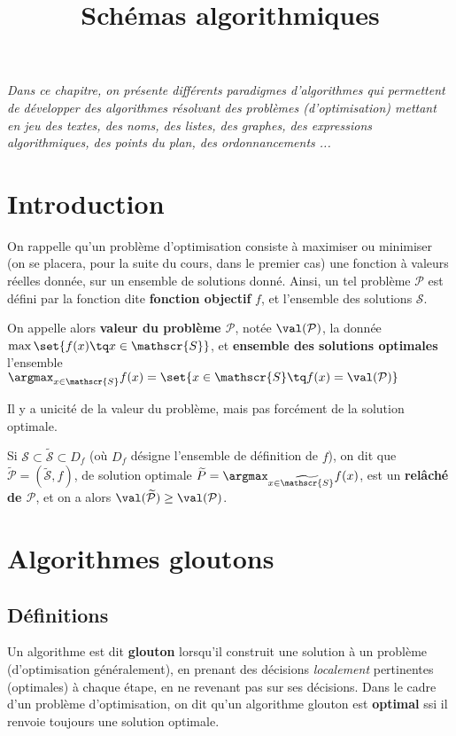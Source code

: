 \documentclass{scrartcl}
\title{Schémas algorithmiques}
\author{}
\date{}
\begin{document}
	\maketitle
	\begin{center}
		\textsl{Dans ce chapitre, on présente différents paradigmes d'algorithmes qui permettent de développer des algorithmes résolvant des problèmes (d'optimisation)
		mettant en jeu des textes, des noms, des listes, des graphes, des expressions algorithmiques, des points du plan, des ordonnancements ...}
	\end{center}

	\section{Introduction}
		On rappelle qu'un problème d'optimisation consiste à maximiser ou minimiser (on se placera, pour la suite du cours, dans le premier cas) une fonction à valeurs réelles donnée, 
		sur un ensemble de solutions donné. 
		Ainsi, un tel problème $\mathcal{P}$ est défini par la fonction dite \textbf{fonction objectif} $f$, 
		et l'ensemble des solutions $\mathscr{S}$.
		
		On appelle alors \textbf{valeur du problème $\mathcal{P}$}, notée $\val(\mathcal{P})$, la donnée $\max \set{f(x) \tq x \in \mathscr{S}}$,
		et \textbf{ensemble des solutions optimales} l'ensemble $\argmax_{x\in\mathscr{S}} f(x) = \set{x \in \mathscr{S} \tq f(x) = \val(\mathcal{P})}$
	
		\rem Il y a unicité de la valeur du problème, mais pas forcément de la solution optimale.

		Si $\mathscr{S} \subset \widetilde{\mathscr{S}} \subset D_f$ (où $D_f$ désigne l'ensemble de définition de $f$), 
		on dit que $\widetilde{\mathcal{P}} = (\widetilde{\mathscr{S}},f)$, 
		de solution optimale $\widetilde{P} = \argmax_{x \in \widetilde{\mathscr{S}}} f(x)$, 
		est un \textbf{relâché de $\mathcal{P}$}, et on a alors $\val(\widetilde{\mathcal{P}}) \geq \val(\mathcal{P})$. 


	\section{Algorithmes gloutons}
		\subsection{Définitions}
			Un algorithme est dit \textbf{glouton} lorsqu'il construit une solution à un problème (d'optimisation généralement), 
			en prenant des décisions \textsl{localement} pertinentes (optimales) à chaque étape, en ne revenant pas sur ses décisions.
			Dans le cadre d'un problème d'optimisation, on dit qu'un algorithme glouton est \textbf{optimal} ssi il renvoie toujours une solution optimale.
			
\end{document}
